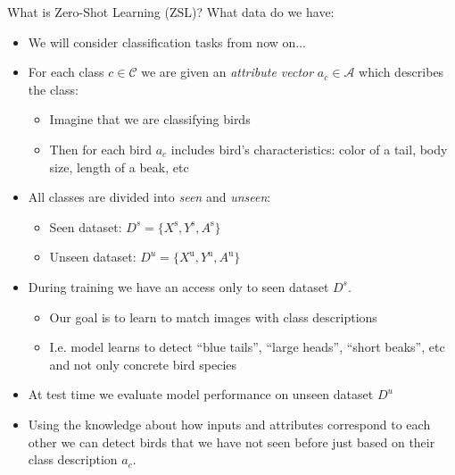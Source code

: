 \documentclass[handout, 10pt]{beamer}
\begin{document}
\begin{frame}{What is Zero-Shot Learning (ZSL)?}
What data do we have:
    \begin{itemize}
        \item\pause We will consider classification tasks from now on...
        \item\pause For each class $c \in \mathcal{C}$ we are given an \textit{attribute vector} $a_c \in \mathcal{A}$ which describes the class:
            \begin{itemize}
                \item\pause Imagine that we are classifying birds
                \item\pause Then for each bird $a_c$ includes bird's characteristics: color of a tail, body size, length of a beak, etc
            \end{itemize}
        \item\pause All classes are divided into \textit{seen} and \textit{unseen}:
            \begin{itemize}
                \item\pause Seen dataset: $D^s = \{X^{\text{s}}, Y^{\text{s}}, A^\text{s}\}$
                \item\pause Unseen dataset: $D^u = \{X^{\text{u}}, Y^{\text{u}}, A^\text{u}\}$
            \end{itemize}
    
    \item\pause During training we have an access only to seen dataset $D^s$.
    \begin{itemize}
        \item\pause Our goal is to learn to match images with class descriptions
        \item\pause I.e. model learns to detect ``blue tails'', ``large heads'', ``short beaks'', etc and not only concrete bird species
    \end{itemize}
    \item\pause At test time we evaluate model performance on unseen dataset $D^u$
    \item\pause Using the knowledge about how inputs and attributes correspond to each other we can detect birds that we have not seen before just based on their class description $a_c$.
\end{itemize}
\end{frame}
\end{document}
